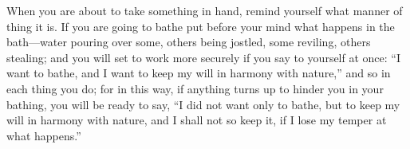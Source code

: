 When you are  about to take something  in hand, remind yourself  what manner of
thing it is. If you are going to bathe put before your mind what happens in the
bath---water pouring  over some,  others being  jostled, some  reviling, others
stealing; and  you will set  to work  more securely if  you say to  yourself at
once: ``I want to  bathe, and I want to keep my will  in harmony with nature,''
and so in  each thing you do; for  in this way, if anything turns  up to hinder
you in your bathing, you will be ready  to say, ``I did not want only to bathe,
but to keep  my will in harmony with nature,  and I shall not so keep  it, if I
lose my temper at what happens.''
